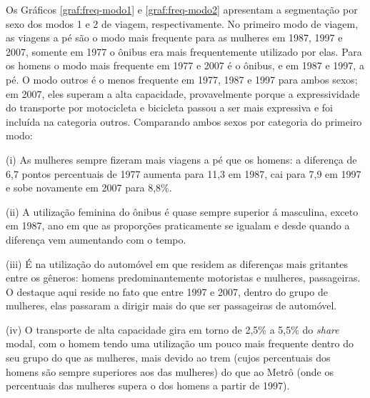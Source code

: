 Os Gráficos \ref{graf:freq-modo1} e \ref{graf:freq-modo2} apresentam a segmentação por sexo dos modos 1 e 2 de viagem, respectivamente.
No primeiro modo de viagem, as viagens a pé são o modo mais frequente para as mulheres em 1987, 1997 e 2007, somente em 1977 o ônibus era mais frequentemente utilizado por elas.
Para os homens o modo mais frequente em 1977 e 2007 é o ônibus, e em 1987 e 1997, a pé.
O modo outros é o menos frequente em 1977, 1987 e 1997 para ambos sexos; em 2007, eles superam a alta capacidade, provavelmente porque a expressividade do transporte por motocicleta e bicicleta passou a ser mais expressiva e foi incluída na categoria outros.
Comparando ambos sexos por categoria do primeiro modo:
\begin{compactitem}[]
\item (i) As mulheres sempre fizeram mais viagens a pé que os homens: a diferença de 6,7 pontos percentuais de 1977 aumenta para 11,3 em 1987, cai para 7,9 em 1997 e sobe novamente em 2007 para 8,8\%.
\item (ii) A utilização feminina do ônibus é quase sempre superior á masculina, exceto em 1987, ano em que as proporções praticamente se igualam e desde quando a diferença vem aumentando com o tempo.
\item (iii) É na utilização do automóvel em que residem as diferenças mais gritantes entre os gêneros: homens predominantemente motoristas e mulheres, passageiras. O destaque aqui reside no fato que entre 1997 e 2007, dentro do grupo de mulheres, elas passaram a dirigir mais do que ser passageiras de automóvel.
\item (iv) O transporte de alta capacidade gira em torno de 2,5\% a 5,5\% do \textit{share} modal, com o homem tendo uma utilização um pouco mais frequente dentro do seu grupo do que as mulheres, mais devido ao trem (cujos percentuais dos homens são sempre superiores aos das mulheres) do que ao Metrô (onde os percentuais das mulheres supera o dos homens a partir de 1997).
\end{compactitem}

